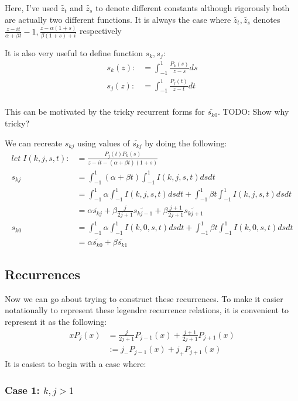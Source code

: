 \documentclass{article}
\begin{document}
Here, I've used $\tilde{z_t}$ and $\tilde{z_s}$ to denote different constants although rigorously both are actually two different functions.
It is always the case where $\tilde{z_t}, \tilde{z_s}$ denotes
$\frac{z-it}{\alpha+\beta t}-1,\frac{z-\alpha(1+s)}{\beta(1+s)+i}$ respectively

It is also very useful to define function $s_k, s_j$:
\begin{align}
	s_k(z) :&= \int_{-1}^1\frac{P_k(s)}{z-s}ds \\ 
	s_j(z) :&= \int_{-1}^1\frac{P_j(t)}{z-t}dt \\ 
\end{align}

This can be motivated by the tricky recurrent forms for $\tilde{s_{k0}}$.
TODO: Show why tricky?

We can recreate $s_{kj}$ using values of $\tilde{s_{kj}}$ by doing the following:
\begin{align}
	let\; I(k,j,s,t) :&= \frac{P_j(t)P_k(s)}{z-it-(\alpha+\beta t)(1+s)}\\ 
	s_{kj} &= \int_{-1}^1(\alpha+\beta t)\int_{-1}^1 I(k,j,s,t) dsdt\\
	&= \int_{-1}^1\alpha\int_{-1}^1 I(k,j,s,t)dsdt +
	\int_{-1}^1\beta t\int_{-1}^1 I(k,j,s,t) dsdt\\
	&= \alpha\tilde{s_{kj}} + \beta\frac{j}{2j+1}\tilde{s_{kj-1}} + \beta\frac{j+1}{2j+1}\tilde{s_{kj+1}} \\
	s_{k0} &= \int_{-1}^1\alpha\int_{-1}^1 I(k,0,s,t)dsdt +
	\int_{-1}^1\beta t\int_{-1}^1 I(k,0,s,t) dsdt \\
	&= \alpha\tilde{s_{k0}} + \beta\tilde{s_{k1}}
\end{align}

\subsection{Recurrences}

Now we can go about trying to construct these recurrences.
To make it easier notationally to represent these legendre recurrence relations, it is convenient to represent it as the following:
\begin{align}
    xP_j(x) &= \frac{j}{2j+1}P_{j-1}(x)+\frac{j+1}{2j+1}P_{j+1}(x) \\
    &:= j_-P_{j-1}(x)+j_+P_{j+1}(x)
\end{align}
It is easiest to begin with a case where:

\subsubsection*{Case 1: $k,j>1$}
\end{document}
